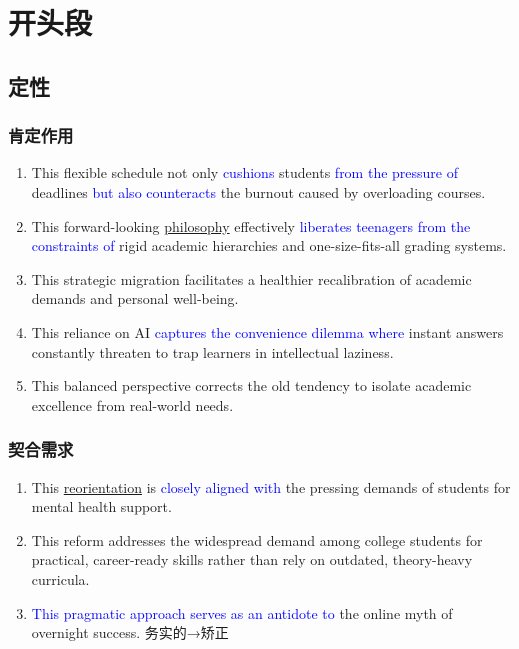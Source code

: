 
\section{开头段}

\subsection{定性}

\subsubsection{肯定作用}
\begin{enumerate}
    \item This flexible schedule not only \textcolor{blue}{cushions} students \textcolor{blue}{from the pressure of} deadlines \textcolor{blue}{but also counteracts} the burnout caused by overloading courses.
    \item This forward-looking \underline{philosophy} effectively \textcolor{blue}{liberates teenagers from the constraints of} rigid academic hierarchies and one-size-fits-all grading systems.
    \item This strategic migration facilitates a healthier recalibration of academic demands and personal well-being.
    \item This reliance on AI \textcolor{blue}{captures the convenience dilemma where} instant answers constantly threaten to trap learners in intellectual laziness.
    \item This balanced perspective corrects the old tendency to isolate academic excellence from real-world needs.
\end{enumerate}

\subsubsection{契合需求}

\begin{enumerate}
    \item This \underline{reorientation} is \textcolor{blue}{closely aligned with} the pressing demands of students for mental health support.
    \item This reform addresses the widespread demand among college students for practical, career-ready skills rather than rely on outdated, theory-heavy curricula.
    \item \textcolor{blue}{This pragmatic approach serves as an antidote to} the online myth of overnight success. 务实的→矫正
\end{enumerate}

